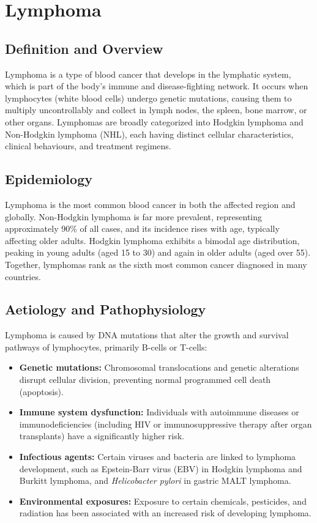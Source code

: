 \chapter{Lymphoma}

\section*{Definition and Overview}
Lymphoma is a type of blood cancer that develops in the lymphatic system, which is part of the body's immune and disease-fighting network. It occurs when lymphocytes (white blood cells) undergo genetic mutations, causing them to multiply uncontrollably and collect in lymph nodes, the spleen, bone marrow, or other organs. Lymphomas are broadly categorized into Hodgkin lymphoma and Non-Hodgkin lymphoma (NHL), each having distinct cellular characteristics, clinical behaviours, and treatment regimens.

\section*{Epidemiology}
Lymphoma is the most common blood cancer in both the affected region and globally. Non-Hodgkin lymphoma is far more prevalent, representing approximately 90\% of all cases, and its incidence rises with age, typically affecting older adults. Hodgkin lymphoma exhibits a bimodal age distribution, peaking in young adults (aged 15 to 30) and again in older adults (aged over 55). Together, lymphomas rank as the sixth most common cancer diagnosed in many countries.

\section*{Aetiology and Pathophysiology}
Lymphoma is caused by DNA mutations that alter the growth and survival pathways of lymphocytes, primarily B-cells or T-cells:

\begin{itemize}
    \item \textbf{Genetic mutations:} Chromosomal translocations and genetic alterations disrupt cellular division, preventing normal programmed cell death (apoptosis).
    \item \textbf{Immune system dysfunction:} Individuals with autoimmune diseases or immunodeficiencies (including HIV or immunosuppressive therapy after organ transplants) have a significantly higher risk.
    \item \textbf{Infectious agents:} Certain viruses and bacteria are linked to lymphoma development, such as Epstein-Barr virus (EBV) in Hodgkin lymphoma and Burkitt lymphoma, and \textit{Helicobacter pylori} in gastric MALT lymphoma.
    \item \textbf{Environmental exposures:} Exposure to certain chemicals, pesticides, and radiation has been associated with an increased risk of developing lymphoma.
\end{itemize}

